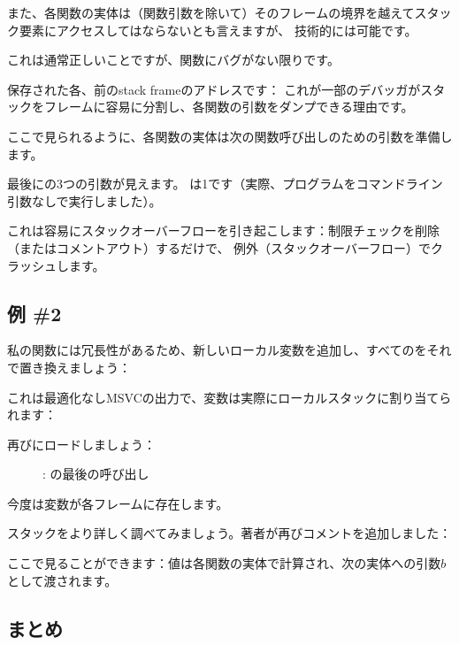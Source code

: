また、各関数の実体は（関数引数を除いて）そのフレームの境界を越えてスタック要素にアクセスしてはならないとも言えますが、
技術的には可能です。

これは通常正しいことですが、関数にバグがない限りです。

保存された各、前の\gls{stack frame}のアドレスです：
これが一部のデバッガがスタックをフレームに容易に分割し、各関数の引数をダンプできる理由です。

ここで見られるように、各関数の実体は次の関数呼び出しのための引数を準備します。

最後に\main の3つの引数が見えます。
は1です（実際、プログラムをコマンドライン引数なしで実行しました）。

これは容易にスタックオーバーフローを引き起こします：制限チェックを削除（またはコメントアウト）するだけで、
例外（スタックオーバーフロー）でクラッシュします。

\subsection{例 \#2}

私の関数には冗長性があるため、新しいローカル変数を追加し、すべてのをそれで置き換えましょう：



これは最適化なしMSVCの出力で、変数は実際にローカルスタックに割り当てられます：



\clearpage
再び\olly にロードしましょう：

\begin{figure}[H]
\centering
{}
\caption{\olly: \ttf{}の最後の呼び出し}
\label{fig:fib_olly2}
\end{figure}

今度は変数が各フレームに存在します。

\clearpage

スタックをより詳しく調べてみましょう。著者が再びコメントを追加しました：



ここで見ることができます：値は各関数の実体で計算され、次の実体への引数$b$として渡されます。

\subsection{まとめ}

